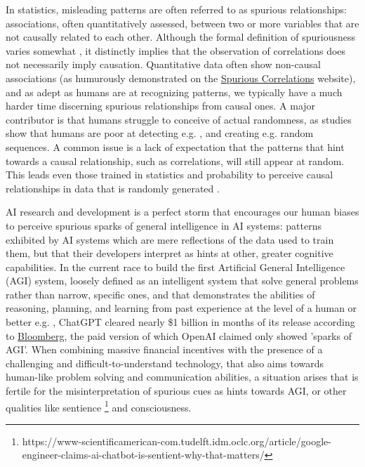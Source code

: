 \documentclass{article}
\theoremstyle{plain}
\theoremstyle{definition}
\theoremstyle{remark}
\begin{document}
In statistics, misleading patterns are often referred to as spurious relationships: associations, often quantitatively assessed, between two or more variables that are not causally related to each other. Although the formal definition of spuriousness varies somewhat \cite{haig2003spurious}, it distinctly implies that the observation of correlations does not necessarily imply causation. Quantitative data often show non-causal associations (as humurously demonstrated on the \href{http://www.tylervigen.com/spurious-correlations}{Spurious Correlations} website), and as adept as humans are at recognizing patterns, we typically have a much harder time discerning spurious relationships from causal ones. A major contributor is that humans struggle to conceive of actual randomness, as studies show that humans are poor at detecting e.g. \cite{falk1997making}, and creating e.g. \cite{ladouceur1996erroneous} random sequences. A common issue is a lack of expectation that the patterns that hint towards a causal relationship, such as correlations, will still appear at random. This leads even those trained in statistics and probability to perceive causal relationships in data that is randomly generated \cite{zgraggen2018investigating}.

AI research and development is a perfect storm that encourages our human biases to perceive spurious sparks of general intelligence in AI systems: patterns exhibited by AI systems which are mere reflections of the data used to train them, but that their developers interpret as hints at other, greater cognitive capabilities. In the current race to build the first Artificial General Intelligence (AGI) system, loosely defined as an intelligent system that solve general problems rather than narrow, specific ones, and that demonstrates the abilities of reasoning, planning, and learning from past experience at the level of a human or better e.g. \cite{bubeck2023sparks}, ChatGPT cleared nearly \$1 billion in months of its release according to \href{https://www.bloomberg.com/news/articles/2023-08-30/openai-nears-1-billion-of-annual-sales-as-chatgpt-takes-off}{Bloomberg}, the paid version of which OpenAI claimed only showed 'sparks of AGI'. When combining massive financial incentives with the presence of a challenging and difficult-to-understand technology, that also aims towards human-like problem solving and communication abilities, a situation arises that is fertile for the misinterpretation of spurious cues as hints towards AGI, or other qualities like sentience \footnote{https://www-scientificamerican-com.tudelft.idm.oclc.org/article/google-engineer-claims-ai-chatbot-is-sentient-why-that-matters/} and consciousness.
\end{document}
